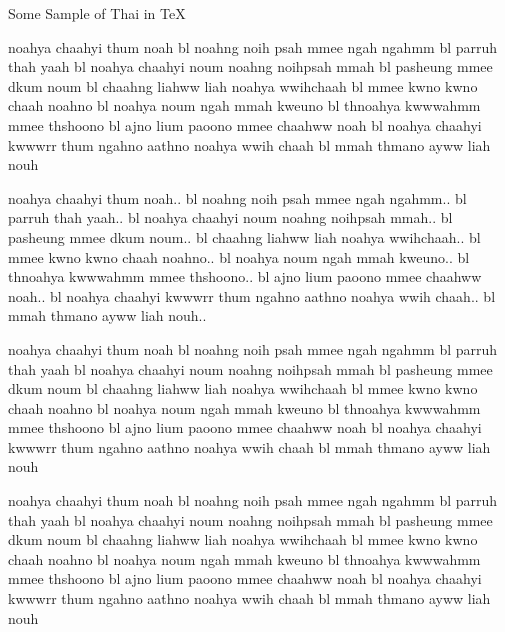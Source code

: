 
\hyphenchar{}
\hyphenchar{}
\hyphenchar{}
\hyphenchar{}
\hyphenchar{}
\hyphenchar{}
\hyphenchar{}


\begin{center}
\Large
Some Sample of Thai in {\TeX}
\end{center}

\sloppy

\thair
noahya chaahyi thum noah bl %
noahng noih psah mmee ngah ngahmm bl %
parruh thah yaah bl %
noahya chaahyi noum noahng noihpsah mmah bl %
pasheung mmee dkum noum bl %
chaahng liahww liah noahya wwihchaah bl %
mmee kwno kwno chaah noahno bl %
noahya noum ngah mmah kweuno bl  %
thnoahya kwwwahmm mmee thshoono bl
ajno lium paoono mmee chaahww noah bl
noahya chaahyi kwwwrr thum ngahno aathno noahya wwih chaah bl
mmah thmano ayww liah nouh

\thairz
noahya chaahyi thum noah.. bl %
noahng noih psah mmee ngah ngahmm.. bl %
parruh thah yaah.. bl %
noahya chaahyi noum noahng noihpsah mmah.. bl %
pasheung mmee dkum noum.. bl %
chaahng liahww liah noahya wwihchaah.. bl %
mmee kwno kwno chaah noahno.. bl %
noahya noum ngah mmah kweuno.. bl  %
thnoahya kwwwahmm mmee thshoono.. bl
ajno lium paoono mmee chaahww noah.. bl
noahya chaahyi kwwwrr thum ngahno aathno noahya wwih chaah.. bl
mmah thmano ayww liah nouh..

\thaii
noahya chaahyi thum noah bl %
noahng noih psah mmee ngah ngahmm bl %
parruh thah yaah bl %
noahya chaahyi noum noahng noihpsah mmah bl %
pasheung mmee dkum noum bl %
chaahng liahww liah noahya wwihchaah bl %
mmee kwno kwno chaah noahno bl %
noahya noum ngah mmah kweuno bl  %
thnoahya kwwwahmm mmee thshoono bl
ajno lium paoono mmee chaahww noah bl
noahya chaahyi kwwwrr thum ngahno aathno noahya wwih chaah bl
mmah thmano ayww liah nouh

\thaibx
noahya chaahyi thum noah bl %
noahng noih psah mmee ngah ngahmm bl %
parruh thah yaah bl %
noahya chaahyi noum noahng noihpsah mmah bl %
pasheung mmee dkum noum bl %
chaahng liahww liah noahya wwihchaah bl %
mmee kwno kwno chaah noahno bl %
noahya noum ngah mmah kweuno bl  %
thnoahya kwwwahmm mmee thshoono bl
ajno lium paoono mmee chaahww noah bl
noahya chaahyi kwwwrr thum ngahno aathno noahya wwih chaah bl
mmah thmano ayww liah nouh

